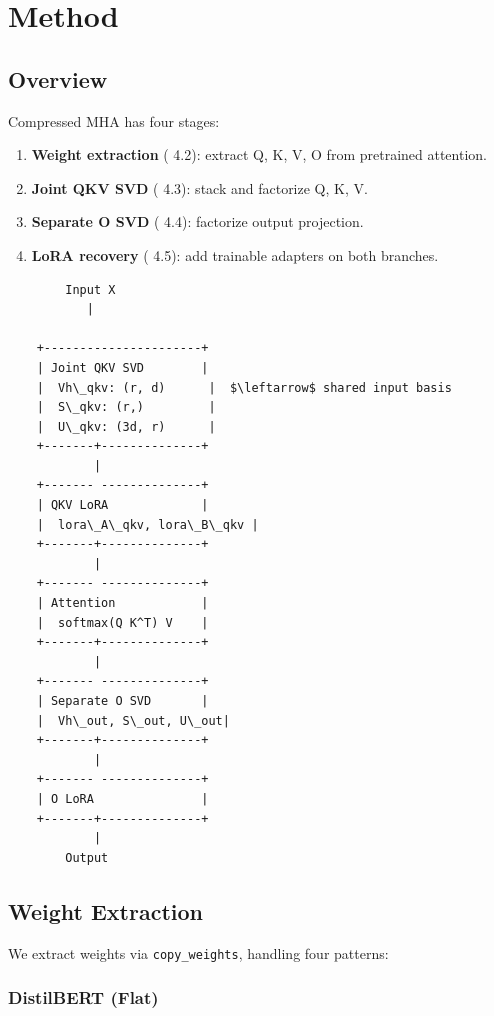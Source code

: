 \section{Method}

\subsection{Overview}

Compressed MHA has four stages:

\begin{enumerate}
\item \textbf{Weight extraction} ( 4.2): extract Q, K, V, O from pretrained attention.
\item \textbf{Joint QKV SVD} ( 4.3): stack and factorize Q, K, V.
\item \textbf{Separate O SVD} ( 4.4): factorize output projection.
\item \textbf{LoRA recovery} ( 4.5): add trainable adapters on both branches.

\end{enumerate}
\begin{lstlisting}
        Input X
           |
            
    +----------------------+
    | Joint QKV SVD        |
    |  Vh\_qkv: (r, d)      |  $\leftarrow$ shared input basis
    |  S\_qkv: (r,)         |
    |  U\_qkv: (3d, r)      |
    +-------+--------------+
            |
    +------- --------------+
    | QKV LoRA             |
    |  lora\_A\_qkv, lora\_B\_qkv |
    +-------+--------------+
            |
    +------- --------------+
    | Attention            |
    |  softmax(Q K^T) V    |
    +-------+--------------+
            |
    +------- --------------+
    | Separate O SVD       |
    |  Vh\_out, S\_out, U\_out|
    +-------+--------------+
            |
    +------- --------------+
    | O LoRA               |
    +-------+--------------+
            |
        Output
\end{lstlisting}

\subsection{Weight Extraction}

We extract weights via \texttt{copy\_weights}, handling four patterns:

\subsubsection{DistilBERT (Flat)}

